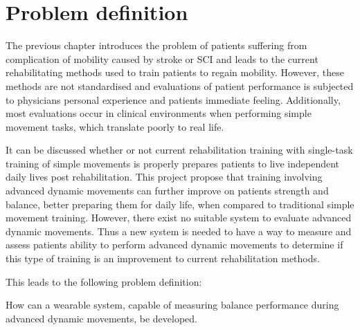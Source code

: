 \section{Problem definition}

The previous chapter introduces the problem of patients suffering from complication of mobility caused by stroke or SCI and leads to the current rehabilitating methods used to train patients to regain mobility. 
However, these methods are not standardised and evaluations of patient performance is subjected to physicians personal experience and patients immediate feeling. Additionally, most evaluations occur in clinical environments when performing simple movement tasks, which translate poorly to real life. 

It can be discussed whether or not current rehabilitation training with single-task training of simple movements is properly prepares patients to live independent daily lives post rehabilitation. This project propose that training involving advanced dynamic movements can further improve on patients strength and balance, better preparing them for daily life, when compared to traditional simple movement training. 
However, there exist no suitable system to evaluate advanced dynamic movements. Thus a new system is needed to have a way to measure and assess patients ability to perform advanced dynamic movements to determine if this type of training is an improvement to current rehabilitation methods.

This leads to the following problem definition:


\begin{center}
How can a wearable system, capable of measuring balance performance during advanced dynamic movements, be developed.
\end{center}
